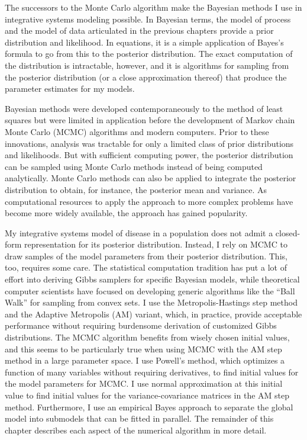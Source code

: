 The successors to the Monte Carlo algorithm make the
Bayesian methods I use in integrative systems modeling possible.  In
Bayesian terms, the model of process and the model of data articulated in
the previous chapters provide a prior distribution and
likelihood.  In equations, it is a simple application of Bayes's
formula to go from this to the posterior distribution.  The exact
computation of the distribution is intractable, however, and it is
algorithms for sampling from the posterior distribution (or a close
approximation thereof) that produce the parameter estimates for my
models.

Bayesian methods were developed contemporaneously to the method of
least squares but were limited in application before the development
of Markov chain Monte Carlo (MCMC) algorithms and modern computers.
Prior to these innovations, analysis was tractable for only a limited
class of prior distributions and likelihoods. But with sufficient
computing power, the posterior distribution can be sampled using Monte
Carlo methods instead of being computed
analytically.\cite{gelman_bayesian_2003} Monte Carlo methods can also
be applied to integrate the posterior distribution to obtain, for
instance, the posterior mean and variance. As computational resources
to apply the approach to more complex problems have become more widely
available, the approach has gained popularity.\cite{tanner_em_2010}

My integrative systems model of disease in a population does not admit
a closed-form representation for its posterior distribution.  Instead,
I rely on MCMC to draw samples of the model parameters from their
posterior distribution.  This, too, requires some care.  The
statistical computation tradition has put a lot of effort into
deriving Gibbs samplers for specific Bayesian models, while
theoretical computer scientists have focused on developing generic
algorithms like the ``Ball Walk'' for sampling from convex sets.  I
use the Metropolis-Hastings step method and the Adaptive Metropolis (AM)
variant,\cite{haario_adaptive_2001} which, in practice, provide
acceptable performance without requiring burdensome derivation of
customized Gibbs distributions. The MCMC algorithm benefits from
wisely chosen initial values, and this seems to be particularly true
when using MCMC with the AM step method in a large parameter space. I
use Powell's method, which optimizes a function of many variables
without requiring derivatives, to find initial values for the model
parameters for MCMC.\cite{powell_efficient_1964}  I use normal approximation at this initial
value to find initial values for the variance-covariance matrices in
the AM step method.  Furthermore, I use an empirical Bayes
approach to separate the global model into submodels that can be fitted
in parallel.  The remainder of this chapter describes each aspect of
the numerical algorithm in more detail.

